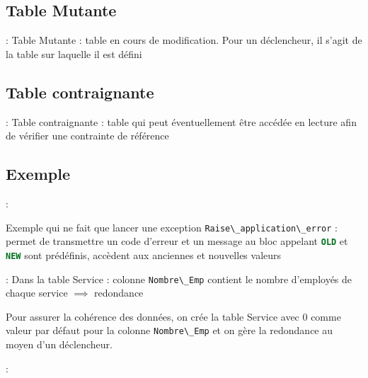 \documentclass[10pt]{beamer}
\begin{document}
\subsection{Table Mutante}
\begin{frame}{\secname : \subsecname}
    Table Mutante : table en cours de modification. Pour un déclencheur, il s'agit de la table sur laquelle il est défini
\end{frame}

\subsection{Table contraignante}
\begin{frame}{\secname : \subsecname}
    Table contraignante : table qui peut éventuellement être accédée en lecture afin de vérifier une contrainte de référence
\end{frame}
\subsection{Exemple}
\begin{frame}{\secname : \subsecname}
    
    Exemple qui ne fait que lancer une exception
    \lstinline[language=sql]!Raise\_application\_error! : permet de transmettre un code d'erreur et un message au bloc appelant
    \lstinline[language=sql]!OLD! et \lstinline[language=sql]!NEW! sont prédéfinis, accèdent aux anciennes et nouvelles valeurs
\end{frame}

\begin{frame}[allowframebreaks]{\secname : \subsecname}
    Dans la table Service : colonne \lstinline[language=sql]!Nombre\_Emp! contient le nombre d'employés de chaque service $\implies$ redondance
    
    Pour assurer la cohérence des données, on crée la table Service avec 0 comme valeur par défaut pour la colonne \lstinline[language=sql]!Nombre\_Emp! et on gère la redondance au moyen d'un déclencheur.
\end{frame}

\begin{frame}{\secname : \subsecname}
    
\end{frame}
\end{document}
